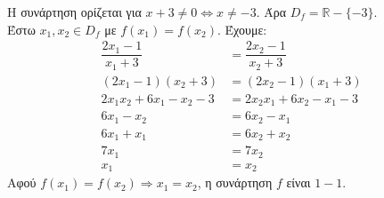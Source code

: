 \lysh
Η συνάρτηση ορίζεται για $x+3 \neq 0 \Leftrightarrow x \neq -3$. Άρα $D_f = \mathbb{R} - \{-3\}$.
\\
Έστω $x_1, x_2 \in D_f$ με $f(x_1) = f(x_2)$. Έχουμε:
\begin{align*}
\dfrac{2x_1-1}{x_1+3} &= \dfrac{2x_2-1}{x_2+3} \\
(2x_1-1)(x_2+3) &= (2x_2-1)(x_1+3) \\
2x_1x_2 + 6x_1 - x_2 - 3 &= 2x_2x_1 + 6x_2 - x_1 - 3\\
6x_1 - x_2 &= 6x_2 - x_1 \\
6x_1 + x_1 &= 6x_2 + x_2 \\
7x_1 &= 7x_2 \\
x_1 &= x_2
\end{align*}
Αφού $f(x_1) = f(x_2) \Rightarrow x_1 = x_2$, η συνάρτηση $f$ είναι {$1-1$}.

